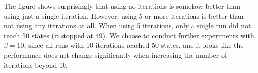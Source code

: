 The figure shows surprisingly that using no iterations is somehow better than using just a single iteration. However, using 5 or more iterations is better than not using any iterations at all.
When using 5 iterations, only a single run did not reach 50 states (it stopped at 49).
We choose to conduct further experiments with $\beta = 10$, since all runs with 10 iterations reached 50 states, and it looks like the performance does not change significantly when increasing the number of iterations beyond 10.